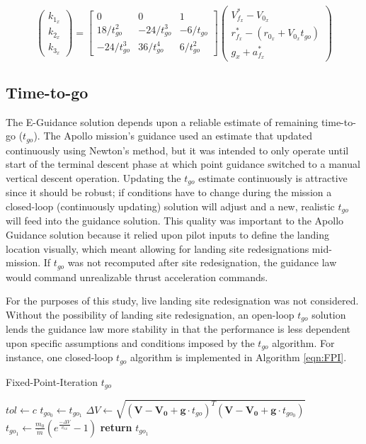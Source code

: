 \begin{equation}
\label{eqn:E_system_adv}
\begin{pmatrix}
k_{1_x} \\
k_{2_x} \\
k_{3_x}
\end{pmatrix}
= 
\begin{bmatrix}
0 & 0 & 1 \\
18/t_{go}^2 & -24/t_{go}^3 & -6/t_{go}\\
-24/t_{go}^3 & 36/t_{go}^4 & 6/t_{go}^2
\end{bmatrix}
\begin{pmatrix}
V_{f_x}^* - V_{0_x} \\ 
r_{f_x}^* - (r_{0_x} + V_{0_x}t_{go}) \\
g_x + a_{f_x}^*
\end{pmatrix}
\end{equation}


\subsection{Time-to-go} \label{sec:Time-to-go}
The E-Guidance solution depends upon a reliable estimate of remaining time-to-go ($t_{go}$). The Apollo mission's guidance used an estimate that updated continuously using Newton's method, but it was intended to only operate until start of the terminal descent phase at which point guidance switched to a manual vertical descent operation. Updating the $t_{go}$ estimate continuously is attractive since it should be robust; if conditions have to change during the mission a closed-loop (continuously updating) solution will adjust and a new, realistic $t_{go}$ will feed into the guidance solution. This quality was important to the Apollo Guidance solution because it relied upon pilot inputs to define the landing location visually, which meant allowing for landing site redesignations mid-mission. If $t_{go}$ was not recomputed after site redesignation, the guidance law would command unrealizable thrust acceleration commands.

For the purposes of this study, live landing site redesignation was not considered. Without the possibility of landing site redesignation, an open-loop $t_{go}$ solution lends the guidance law more stability in that the performance is less dependent upon specific assumptions and conditions imposed by the $t_{go}$ algorithm. For instance, one closed-loop $t_{go}$ algorithm is implemented in Algorithm \ref{eqn:FPI}.

\begin{algorithm}
	\caption{Fixed-Point-Iteration $t_{go}$}\label{eqn:FPI}
	\begin{algorithmic}[1]
		\State $tol\gets c$
		\State $t_{go_0} \gets t_{go_1}$
		\State $\Delta V \gets \sqrt{(\boldsymbol{V}-\boldsymbol{V_0} + \boldsymbol{g}\cdot t_{go})^T(\boldsymbol{V}-\boldsymbol{V_0} + \boldsymbol{g}\cdot t_{go_0})}$
		\State $t_{go_1} \gets \frac{m_0}{\dot{m}}\left(e^{\frac{-\Delta V}{v_{ex}}}-1\right)$ 
		\EndWhile
		\State \textbf{return} $t_{go_1}$
	\end{algorithmic}
\end{algorithm}


